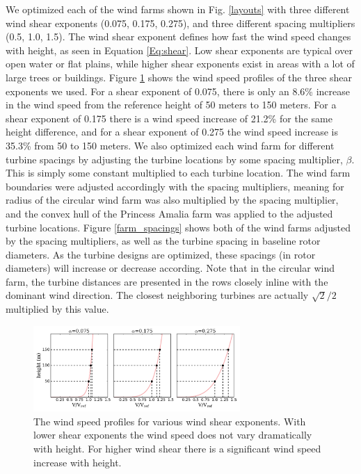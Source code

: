 We optimized each of the wind farms shown in Fig. \ref{layouts} with three different wind shear exponents (0.075, 0.175, 0.275), and three different spacing multipliers (0.5, 1.0, 1.5). The wind shear exponent defines how fast the wind speed changes with height, as seen in Equation \ref{Eq:shear}. Low shear exponents are typical over open water or flat plains, while higher shear exponents exist in areas with a lot of large trees or buildings. Figure \ref{shear_profile} shows the wind speed profiles of the three shear exponents we used. For a shear exponent of 0.075, there is only an 8.6\% increase in the wind speed from the reference height of 50 meters to 150 meters. For a shear exponent of 0.175 there is a wind speed increase of 21.2\% for the same height difference, and for a shear exponent of 0.275 the wind speed increase is 35.3\% from 50 to 150 meters. We also optimized each wind farm for different turbine spacings by adjusting the turbine locations by some spacing multiplier, $\beta$.  This is simply some constant multiplied to each turbine location. The wind farm boundaries were adjusted accordingly with the spacing multipliers, meaning for radius of the circular wind farm was also multiplied by the spacing multiplier, and the convex hull of the Princess Amalia farm was applied to the adjusted turbine locations. Figure \ref{farm_spacings} shows both of the wind farms adjusted by the spacing multipliers, as well as the turbine spacing in baseline rotor diameters. As the turbine designs are optimized, these spacings (in rotor diameters) will increase or decrease according. Note that in the circular wind farm, the turbine distances are presented in the rows closely inline with the dominant wind direction. The closest neighboring turbines are actually $\sqrt{2}/2$ multiplied by this value. 


\begin{figure}[htbp]
  \centering
  \includegraphics[width=0.7\textwidth]{Figures/shears.pdf}
  \caption{\label{shear_profile}The wind speed profiles for various wind shear exponents. With lower shear exponents the wind speed does not vary dramatically with height. For higher wind shear there is a significant wind speed increase with height.}
\end{figure}

